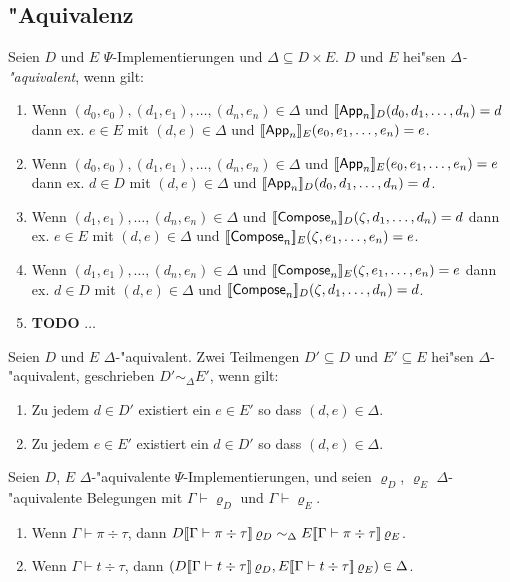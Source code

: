 \documentclass[12pt,a4paper,draft]{article}
\newcommand{\Tj}[3]{{#1}\vdash{#2}\div{#3}}
\begin{document}
\subsection*{"Aquivalenz}

\begin{definition}
  Seien $D$ und $E$ $\Psi$-Implementierungen und $\Delta \subseteq D \times E$. $D$ und $E$ hei"sen
  \emph{$\Delta$-"aquivalent}, wenn gilt:
  \begin{enumerate}
  \item Wenn $(d_0,e_0),(d_1,e_1),\ldots,(d_n,e_n) \in \Delta$ und $[\![\mathsf{App}_n]\!]_D(d_0,d_1,\ldots,d_n) = d$
    dann ex. $e \in E$ mit $(d,e) \in \Delta$ und $[\![\mathsf{App}_n]\!]_E(e_0,e_1,\ldots,e_n) = e$.
  \item Wenn $(d_0,e_0),(d_1,e_1),\ldots,(d_n,e_n) \in \Delta$ und $[\![\mathsf{App}_n]\!]_E(e_0,e_1,\ldots,e_n) = e$
    dann ex. $d \in D$ mit $(d,e) \in \Delta$ und $[\![\mathsf{App}_n]\!]_D(d_0,d_1,\ldots,d_n) = d$.
  \item Wenn $(d_1,e_1),\ldots,(d_n,e_n) \in \Delta$ und $[\![\mathsf{Compose}_n]\!]_D(\zeta,d_1,\ldots,d_n) = d$
    dann ex. $e \in E$ mit $(d,e) \in \Delta$ und $[\![\mathsf{Compose}_n]\!]_E(\zeta,e_1,\ldots,e_n) = e$.
  \item Wenn $(d_1,e_1),\ldots,(d_n,e_n) \in \Delta$ und $[\![\mathsf{Compose}_n]\!]_E(\zeta,e_1,\ldots,e_n) = e$
    dann ex. $d \in D$ mit $(d,e) \in \Delta$ und $[\![\mathsf{Compose}_n]\!]_D(\zeta,d_1,\ldots,d_n) = d$.
  \item \textbf{TODO} $\ldots$
  \end{enumerate}
\end{definition}
Seien $D$ und $E$ $\Delta$-"aquivalent. Zwei Teilmengen $D' \subseteq D$ und $E' \subseteq E$ hei"sen 
$\Delta$-"aquivalent, geschrieben $D' \sim_\Delta E'$, wenn gilt:
\begin{enumerate}
\item Zu jedem $d \in D'$ existiert ein $e \in E'$ so dass $(d,e) \in \Delta$.
\item Zu jedem $e \in E'$ existiert ein $d \in D'$ so dass $(d,e) \in \Delta$.
\end{enumerate}

\begin{lemma}
  Seien $D$, $E$ $\Delta$-"aquivalente $\Psi$-Implementierungen, und seien
  $\varrho_D$, $\varrho_E$ $\Delta$-"aquivalente Belegungen mit $\Gamma \vdash \varrho_D$
  und $\Gamma \vdash \varrho_E$.
  \begin{enumerate}
  \item Wenn $\Tj{\Gamma}{\pi}{\tau}$, dann
    $D\sem{\Tj{\Gamma}{\pi}{\tau}}\,\varrho_D \sim_\Delta E\sem{\Tj{\Gamma}{\pi}{\tau}}\,\varrho_E$.
  \item Wenn $\Tj{\Gamma}{t}{\tau}$, dann
    $(D\sem{\Tj{\Gamma}{t}{\tau}}\,\varrho_D,E\sem{\Tj{\Gamma}{t}{\tau}}\,\varrho_E) \in \Delta$.
  \end{enumerate}
\end{lemma}
\end{document}

